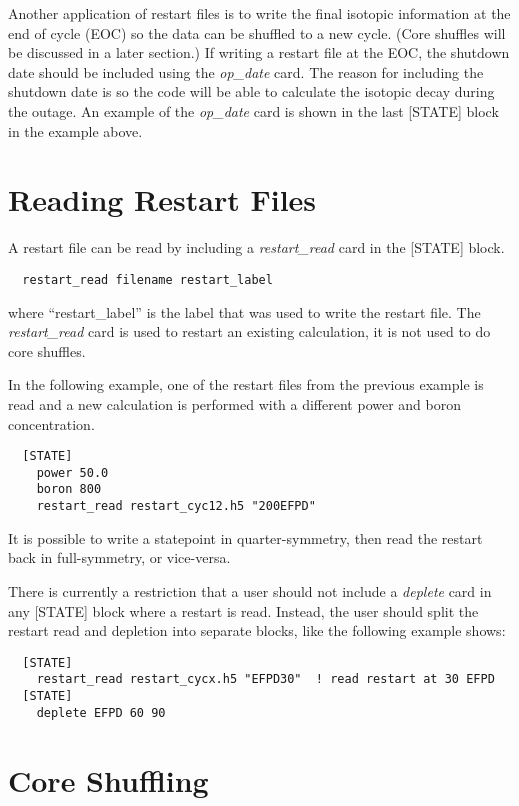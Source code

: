 Another application of restart files is to write the final isotopic information at the end of cycle (EOC)
so the data can be shuffled to a new cycle.  (Core shuffles will be discussed in a later section.)
If writing a restart file at the EOC, the shutdown date should be included using the {\it op\_date} card.
The reason for including the shutdown date is so the code will be able to calculate the isotopic decay
during the outage.  An example of the {\it op\_date} card is shown in the last [STATE] block in the example above.


\section{Reading Restart Files}

A restart file can be read by including a {\it restart\_read} card in the [STATE] block.
\begin{verbatim}
  restart_read filename restart_label
\end{verbatim}
where ``restart\_label'' is the label that was used to write the restart file.
The {\it restart\_read} card is used to restart an existing calculation, it is 
not used to do core shuffles.

In the following example, one of the restart files from the previous example
is read and a new calculation is performed with a different power and boron concentration.
\begin{verbatim}
  [STATE]
    power 50.0
    boron 800
    restart_read restart_cyc12.h5 "200EFPD"
\end{verbatim}

It is possible to write a statepoint in quarter-symmetry, then read the restart back in full-symmetry,
or vice-versa.

There is currently a restriction that a user should not include a {\it deplete} card in any 
[STATE] block where a restart is read.  Instead, the user should split the restart read and depletion
into separate blocks, like the following example shows:
\begin{verbatim}
  [STATE]
    restart_read restart_cycx.h5 "EFPD30"  ! read restart at 30 EFPD
  [STATE]
    deplete EFPD 60 90 
\end{verbatim}


\section{Core Shuffling}

